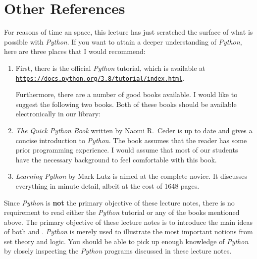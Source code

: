 \section{Other References}
For reasons of time an space, this lecture has just scratched the surface of what is possible with
\textsl{Python}.  If you want to attain a deeper understanding of \textsl{Python}, here are three places that 
I would recommend:
\begin{enumerate}
\item First, there is the official \textsl{Python} tutorial, which is available at
      \\[0.2cm]
      \hspace*{1.3cm}
      \href{https://docs.python.org/3.8/tutorial/index.html}{\texttt{https://docs.python.org/3.8/tutorial/index.html}}.

      Furthermore, there are a number of good books available.  I would like to suggest the following two
      books.  Both of these books should be available electronically in our library:
\item \emph{The Quick Python Book} written by Naomi R.~Ceder \cite{ceder:2018} is up to date and gives a
      concise introduction to \textsl{Python}.  The book assumes that the reader has some prior programming
      experience.  I would assume that most of our students have the necessary background to feel comfortable
      with this book.
\item \emph{Learning Python} by Mark Lutz \cite{lutz:2013} is aimed at the complete novice.  It discusses
      everything in minute detail, albeit at the cost of 1648 pages.
\end{enumerate}
Since \textsl{Python} is \textbf{not} the primary objective of these lecture notes, there is no requirement to read
either the \textsl{Python} tutorial or any of the books mentioned above.  The primary objective of these
lecture notes is to introduce the main ideas of both  and .
\textsl{Python} is merely used to illustrate the most important notions from set theory and logic.  You should
be able to pick up enough knowledge of \textsl{Python} by closely inspecting the \textsl{Python} programs
discussed in these lecture notes.  


